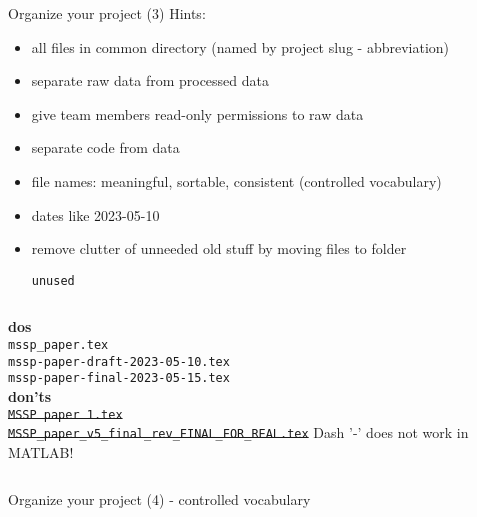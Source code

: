 \documentclass[10pt,aspectratio=169,notes]{beamer} %
\begin{document}
\begin{frame}[t]{Organize your project (3)}
Hints:
\begin{itemize}
	\item all files in common directory (named by project slug - abbreviation) 
	\item separate raw data from processed data
	\item give team members read-only permissions to raw data
	\item separate code from data
	\item file names: meaningful, sortable, consistent (controlled vocabulary)
	\item dates like 2023-05-10
	\item remove clutter of unneeded old stuff by moving files to folder 
	\texttt{unused}
\end{itemize}	
\begin{columns}[T]
	\hspace{5mm}
	\textbf{dos}\\
	\texttt{mssp\_paper.tex}\\
	\texttt{mssp-paper-draft-2023-05-10.tex}\\
	\texttt{mssp-paper-final-2023-05-15.tex}\\
	\textbf{don'ts}\\
	\sout{\texttt{MSSP paper 1.tex}}\\
	\sout{\texttt{MSSP\_paper\_v5\_final\_rev\_FINAL\_FOR\_REAL.tex}}
	\alert{Dash '-' does not work in MATLAB!}
\end{columns}

\end{frame}
\begin{frame}[t]{Organize your project (4) - controlled vocabulary}

\end{frame}
\note{
}
\end{document}
